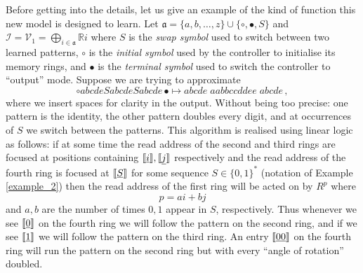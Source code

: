 \documentclass[english,letter paper,12pt,leqno]{article}
\theoremstyle{example}
\numberwithin{equation}{section}
\def\be{\begin{equation}}
\def\ee{\end{equation}}
\begin{document}
Before getting into the details, let us give an example of the kind of function this new model is designed to learn. Let $\mathfrak{a} = \{a,b,\ldots,z\} \cup \{\circ, \bullet, S\}$ and $\mathscr{I} = \mathscr{V}_1 = \bigoplus_{i \in \mathfrak{a}} \mathbb{R} i$ where $S$ is the \emph{swap symbol} used to switch between two learned patterns, $\circ$ is the \emph{initial symbol} used by the controller to initialise its memory rings, and $\bullet$ is the \emph{terminal symbol} used to switch the controller to ``output'' mode. Suppose we are trying to approximate
\be\label{eq:example_seq_func}
\circ abcde S abcde S abcde \,\bullet \longmapsto abcde \; aabbccddee \; abcde\,,
\ee
where we insert spaces for clarity in the output. Without being too precise: one pattern is the identity, the other pattern doubles every digit, and at occurrences of $S$ we switch between the patterns. This algorithm is realised using linear logic as follows: if at some time the read address of the second and third rings are focused at positions containing $\llbracket \underline{i} \rrbracket, \llbracket \underline{j} \rrbracket$ respectively and the read address of the fourth ring is focused at $\llbracket \underline{S} \rrbracket$ for some sequence $S \in \{0,1\}^*$ (notation of Example \ref{example_2}) then the read address of the first ring will be acted on by $R^p$ where
\[
p = ai + bj
\]
and $a, b$ are the number of times $0,1$ appear in $S$, respectively. Thus whenever we see $\llbracket \underline{0} \rrbracket$ on the fourth ring we will follow the pattern on the second ring, and if we see $\llbracket \underline{1} \rrbracket$ we will follow the pattern on the third ring. An entry $\llbracket \underline{00} \rrbracket$ on the fourth ring will run the pattern on the second ring but with every ``angle of rotation'' doubled. 
\end{document}
